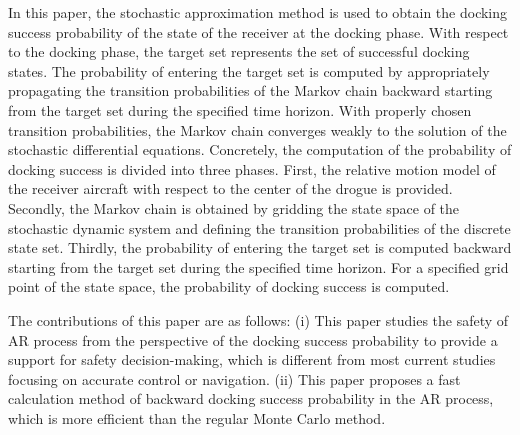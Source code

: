In this paper, the stochastic approximation method is used to obtain the docking success probability of the state of the receiver at the docking phase. With respect to the docking phase, the target set represents the set of successful docking states. The probability of entering the target set is computed by appropriately propagating the transition probabilities of the Markov chain backward starting from the target set during the specified time horizon. With properly chosen transition probabilities, the Markov chain converges weakly  to the solution of the stochastic differential equations. Concretely, the computation of the probability of docking success is divided into three phases. First, the relative motion model of the receiver aircraft with respect to the center of the drogue is provided. Secondly, the Markov chain is obtained by gridding the state space of the stochastic dynamic system and defining the transition probabilities of the discrete state set. Thirdly, the probability of entering the target set is computed backward starting from the target set during the specified time horizon. For a specified grid point of the state space, the probability of docking success is computed.

The contributions of this paper are as follows: (i) This paper studies the safety of AR process from the perspective of the docking success probability to provide a support for safety decision-making, which is different from most current studies focusing on accurate control or navigation. (ii) This paper proposes a fast calculation method of backward docking success probability in the AR process, which is more efficient than the regular Monte Carlo method.





